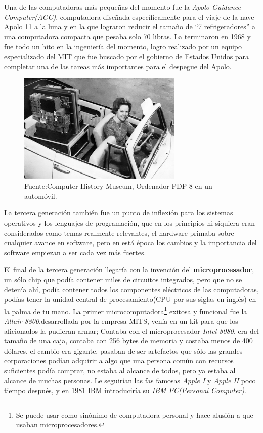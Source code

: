 \documentclass[letterpaper,12pt,oneside]{book}
\begin{document}
		Una de las computadoras más pequeñas del momento fue la \textit{Apolo Guidance Computer(AGC)}, computadora diseñada específicamente para el viaje
		de la nave Apolo 11  a la luna y en la que lograron reducir el tamaño de ``7 refrigeradores'' a una computadora compacta que pesaba solo 70 libras.
 		La terminaron en 1968 y fue todo un hito en la ingeniería del momento, logro realizado por un equipo especializado del MIT que fue buscado
 		por el gobierno de Estados Unidos para completar una de las tareas más importantes para el despegue del Apolo\cite{computer_history_museum_computers_nodate}.
		
		\begin{figure}
		    \centering
		    \includegraphics[width=0.7\textwidth]{media/Historia/CHM_computers_1964.pdp8.jpg}
		    \caption{Fuente:Computer History Museum, Ordenador PDP-8 en un automóvil.} %
	    	\label{fig:pdp8}
		\end{figure}
		
		La tercera generación también fue un punto de inflexión para los sistemas operativos y los lenguajes de programación, que en los principios
		ni siquiera eran considerados como temas realmente relevantes, el hardware primaba sobre cualquier avance en software, pero en está época
		los cambios y la importancia del software empiezan a ser cada vez más fuertes\cite{tanenbaum_modern_2002}.
		
		El final de la tercera generación llegaría con la invención del \textbf{microprocesador}, un sólo chip que podía contener miles de circuitos integrados,
		pero que no se detenía ahí, podía contener todos los componentes eléctricos de las computadoras, podías tener la unidad central de procesamiento(CPU por sus
		siglas en inglés) en la palma de tu mano. La primer microcomputadora\footnote{Se puede usar como sinónimo de computadora personal y hace alusión a que usaban microprocesadores.} exitosa y funcional
		fue la \textit{Altair 8800},desarrollada por la empresa MITS, venía en un kit para que los aficionados la pudieran armar; Contaba
		con el microprocesador \textit{Intel 8080}, era del tamaño de una caja, contaba con 256 bytes de memoria y costaba menos de 400 dólares, el cambio
		era gigante, pasaban de ser artefactos que sólo las grandes corporaciones podían adquirir a algo que una persona común con recursos suficientes
		podía comprar, no estaba al alcance de todos, pero ya estaba al alcance de muchas personas. Le seguirían las fas famosas \textit{Apple I}
		y \textit{Apple II} poco tiempo después, y en 1981 IBM introduciría su \textit{IBM PC(Personal Computer)}\cite{null_essentials_2003}.
\end{document}
